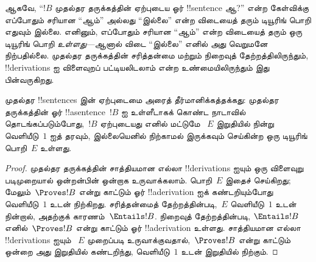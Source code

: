\documentclass[../../../include/open-logic-section]{subfiles}
\begin{document}
\begin{explain}
ஆகவே, ``$!B$ முதல்தர தருக்கத்தின் ஏற்புடைய ஓர்
!!{sentence} ஆ?'' என்ற கேள்விக்கு எப்போதும் சரியான ``ஆம்'' அல்லது
``இல்லை'' என்ற விடையைத் தரும் டியூரிங் பொறி எதுவும் இல்லை. எனினும்,
எப்போதும் சரியான ``ஆம்'' என்ற விடையைத் தரும் ஒரு டியூரிங் பொறி
\emph{உள்ளது}---ஆனால் விடை ``இல்லை'' எனில் அது வெறுமனே நிற்பதில்லை.
முதல்தர தருக்கத்தின் சரித்தன்மை மற்றும் நிறைவுத் தேற்றத்திலிருந்தும்,
!!{derivation}s ஐ விளைவுறப் பட்டியலிடலாம் என்ற உண்மையிலிருந்தும் இது
பின்வருகிறது.
\end{explain}

\begin{thm}
  முதல்தர !!{sentence}s இன் ஏற்புடைமை அரைத் தீர்மானிக்கத்தக்கது:
  முதல்தர தருக்கத்தின் ஓர் !!a{sentence}~$!B$ ஐ உள்ளீடாகக்
  கொண்ட நாடாவில் தொடங்கப்படும்போது,~$!B$ ஏற்புடையது எனில் மட்டுமே
  ~$E$ இறுதியில் நின்று வெளியீடு~$1$ ஐத் தரவும், இல்லையெனில் நிற்காமல்
  இருக்கவும் செய்கின்ற ஒரு டியூரிங் பொறி~$E$ உள்ளது.
\end{thm}

\begin{proof}
  முதல்தர தருக்கத்தின் சாத்தியமான எல்லா !!{derivation}s ஐயும்
  ஒரு விளைவுறு படிமுறையால் ஒன்றன்பின் ஒன்றாக உருவாக்கலாம். பொறி~$E$
  இதைச் செய்கிறது; மேலும்~$\Proves !B$ என்று காட்டும் ஓர்
  !!a{derivation} ஐக் கண்டறியும்போது வெளியீடு~$1$ உடன் நிற்கிறது.
  சரித்தன்மைத் தேற்றத்தின்படி,~$E$ வெளியீடு~$1$ உடன் நின்றால்,
  அதற்குக் காரணம்~$\Entails !B$. நிறைவுத் தேற்றத்தின்படி,
  $\Entails !B$ எனில்~$\Proves !B$ என்று காட்டும் ஓர்
  !!a{derivation} உள்ளது. சாத்தியமான எல்லா !!{derivation}s ஐயும்
  ~$E$ முறைப்படி உருவாக்குவதால்,~$\Proves !B$ என்று காட்டும் ஒன்றை
  அது இறுதியில் கண்டறிந்து, வெளியீடு~$1$ உடன் இறுதியில் நிற்கும்.
\end{proof}
\end{document}
